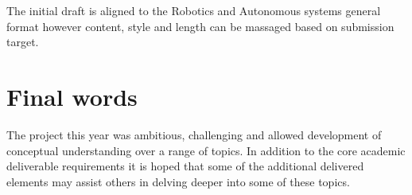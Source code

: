 \documentclass{article}
\begin{document}
The initial draft is aligned to the Robotics and Autonomous systems general format however content, style and length can be massaged based on submission target.


\section*{Final words}
The project this year was ambitious, challenging and allowed development of conceptual understanding over a range of topics. In addition to the core academic deliverable requirements it is hoped that some of the additional delivered elements may assist others in delving deeper into some of these topics.


\end{document}
